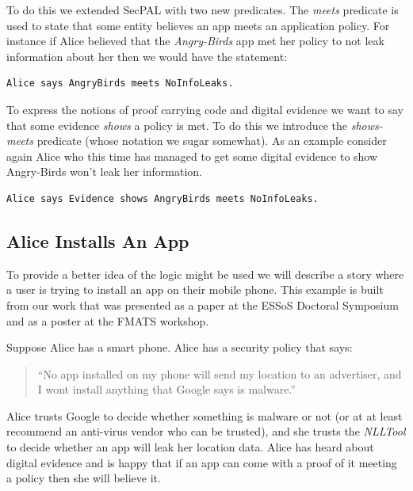 \documentclass[a4paper]{article}
\begin{document}
To do this we extended SecPAL with two new predicates.  The \emph{meets}
predicate is used to state that some entity believes an app meets an application
policy.  For instance if Alice believed that the \emph{Angry-Birds} app met her
policy to not leak information about her then we would have the statement:

\begin{lstlisting}[language=SecPAL]
Alice says AngryBirds meets NoInfoLeaks.
\end{lstlisting}

To express the notions of proof carrying code\cite{Necula:1996tr} and digital
evidence we want to say that some evidence \emph{shows} a policy is met.  To do
this we introduce the \emph{shows-meets} predicate (whose notation we sugar
somewhat).  As an example consider again Alice who this time has managed to get
some digital evidence to show Angry-Birds won't leak her information.

\begin{lstlisting}[language=SecPAL]
Alice says Evidence shows AngryBirds meets NoInfoLeaks.
\end{lstlisting}

\subsection{Alice Installs An App}

To provide a better idea of the logic might be used we will describe a story
where a user is trying to install an app on their mobile phone.  This example is
built from our work that was presented as a paper at the ESSoS Doctoral
Symposium\cite{Hallett:2014un} and as a poster at the FMATS workshop.

Suppose Alice has a smart phone.  Alice has a security policy that says:

\begin{quote}
    ``No app installed on my phone will send my location to an advertiser, and I
      wont install anything that Google says is malware.''
\end{quote}

Alice trusts Google to decide whether something is malware or not (or at at
least recommend an anti-virus vendor who can be trusted), and she trusts the
\emph{NLLTool} to decide whether an app will leak her location
data.  Alice has heard about digital evidence and is happy that if an app can
come with a proof of it meeting a policy then she will believe it.
\end{document}
